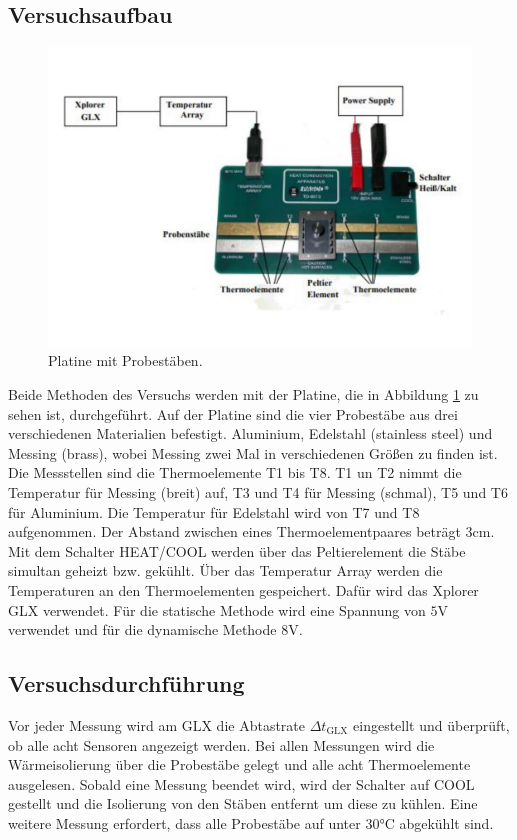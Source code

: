 \subsection{Versuchsaufbau}
\label{subsec:Versuchsaufbau}
\begin{figure}
    \centering
    \includegraphics[width=\textwidth]{platine.pdf}
    \caption{Platine mit Probestäben.\cite{anleitung}}
    \label{fig:platine}
\end{figure}
Beide Methoden des Versuchs werden mit der Platine, die in Abbildung \ref{fig:platine} zu sehen ist, durchgeführt.
Auf der Platine sind die vier Probestäbe aus drei verschiedenen Materialien befestigt.
Aluminium, Edelstahl (stainless steel) und Messing (brass), wobei Messing zwei Mal in verschiedenen Größen zu finden ist.
Die Messstellen sind die Thermoelemente T1 bis T8.
T1 un T2 nimmt die Temperatur für Messing (breit) auf, T3 und T4 für Messing (schmal), T5 und T6 für Aluminium.
Die Temperatur für Edelstahl wird von T7 und T8 aufgenommen.
Der Abstand zwischen eines Thermoelementpaares beträgt $3\si{\centi\meter}$.
Mit dem Schalter HEAT/COOL werden über das Peltierelement die Stäbe simultan geheizt bzw. gekühlt.
Über das Temperatur Array werden die Temperaturen an den Thermoelementen gespeichert.
Dafür wird das Xplorer GLX verwendet.
Für die statische Methode wird eine Spannung von $5\si{\volt}$ verwendet und für die dynamische Methode $8\si{\volt}$.

\subsection{Versuchsdurchführung}
\label{subsec:Versuchsdurchführung}
Vor jeder Messung wird am GLX die Abtastrate $\Delta t_\text{GLX}$ eingestellt und überprüft, ob alle acht Sensoren angezeigt werden.
Bei allen Messungen wird die Wärmeisolierung über die Probestäbe gelegt und alle acht Thermoelemente ausgelesen.
Sobald eine Messung beendet wird, wird der Schalter auf COOL gestellt und die Isolierung von den Stäben entfernt um diese zu kühlen.
Eine weitere Messung erfordert, dass alle Probestäbe auf unter $30\si{\celsius}$ abgekühlt sind.
